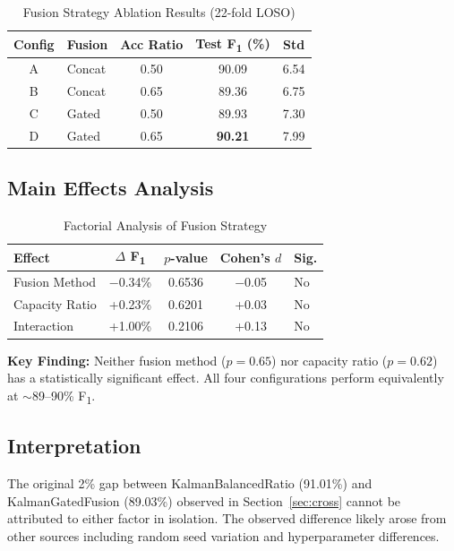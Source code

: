 \documentclass[journal,12pt]{IEEEtran}
\newcommand{\best}[1]{\textbf{\textcolor{bestresult}{#1}}}
\newcommand{\fone}{F\textsubscript{1}}
\begin{document}
\begin{table}[htbp]
\centering
\caption{Fusion Strategy Ablation Results (22-fold LOSO)}
\label{tab:fusion_results}
\begin{tabular}{@{}clccc@{}}
\toprule
\textbf{Config} & \textbf{Fusion} & \textbf{Acc Ratio} & \textbf{Test \fone{} (\%)} & \textbf{Std} \\
\midrule
A & Concat & 0.50 & 90.09 & 6.54 \\
B & Concat & 0.65 & 89.36 & 6.75 \\
C & Gated & 0.50 & 89.93 & 7.30 \\
D & Gated & 0.65 & \best{90.21} & 7.99 \\
\bottomrule
\end{tabular}
\end{table}

\subsection{Main Effects Analysis}

\begin{table}[htbp]
\centering
\caption{Factorial Analysis of Fusion Strategy}
\label{tab:fusion_stats}
\begin{tabular}{@{}lcccl@{}}
\toprule
\textbf{Effect} & $\Delta$ \textbf{\fone{}} & \textbf{$p$-value} & \textbf{Cohen's $d$} & \textbf{Sig.} \\
\midrule
Fusion Method & $-$0.34\% & 0.6536 & $-$0.05 & No \\
Capacity Ratio & +0.23\% & 0.6201 & +0.03 & No \\
Interaction & +1.00\% & 0.2106 & +0.13 & No \\
\bottomrule
\end{tabular}
\end{table}

\textbf{Key Finding:} Neither fusion method ($p = 0.65$) nor capacity ratio ($p = 0.62$) has a statistically significant effect. All four configurations perform equivalently at $\sim$89--90\% \fone{}.

\subsection{Interpretation}

The original 2\% gap between KalmanBalancedRatio (91.01\%) and KalmanGatedFusion (89.03\%) observed in Section~\ref{sec:cross} cannot be attributed to either factor in isolation. The observed difference likely arose from other sources including random seed variation and hyperparameter differences.
\end{document}
